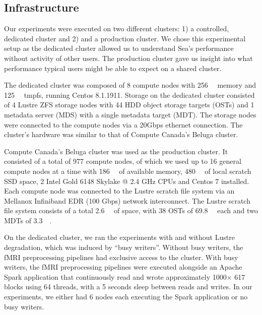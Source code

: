\documentclass[fleqn,10pt]{wlscirep}
\begin{document}
    
    \subsection{Infrastructure}
    
    Our experiments were executed on two different clusters: 1) a controlled, dedicated cluster
    and 2) and a production cluster. We chose this experimental setup as the dedicated
    cluster allowed us to understand Sea's performance without activity of other users.
    The production cluster gave us insight into what performance typical users might
    be able to expect on a shared cluster.

    The dedicated cluster was composed of 8
    compute nodes with \SI{256}{\gibi\byte} memory and \SI{125}{\gibi\byte}
    tmpfs, running Centos 8.1.1911.
    Storage on the dedicated cluster consisted of 4 Lustre ZFS storage nodes with 44
    HDD object storage targets (OSTs) and 1 metadata server (MDS) with a single
    metadata target (MDT). The storage nodes were connected to the compute nodes
    via a 20Gbps ethernet connection. The cluster's hardware was similar to that
    of Compute Canada's Beluga cluster.
    
    Compute Canada's Beluga cluster was used as the production cluster.
    It consisted of a total of 977 compute nodes, of which we
    used up to 16 general compute nodes at a time with \SI{186}{\gibi\byte} of
    available memory, \SI{480}{\gibi\byte} of local scratch SSD space, 2 Intel
    Gold 6148 Skylake @ 2.4 GHz CPUs and Centos 7 installed. Each compute node
    was connected to the Lustre scratch file system via an Mellanox Infiniband
    EDR (100 Gbps) network interconnect. The Lustre scratch file system consists
    of a total \SI{2.6}{\pebi\byte} of space, with 38 OSTs of
    \SI{69.8}{\tebi\byte} each and two MDTs of \SI{3.3}{\tebi\byte}.

    On the dedicated cluster, we ran the experiments with and without
    Lustre degradation, which was induced by ``busy writers''. Without busy
    writers, the fMRI preprocessing pipelines had exclusive access to the
    cluster. With busy writers, the fMRI preprocessing pipelines were executed
    alongside an Apache Spark application that continuously read and wrote approximately
    1000$\times$ \SI{617}{\mebi\byte} blocks using 64 threads, with a 5 seconds sleep between reads
    and writes. In our experiments, we either had 6 nodes each executing the
    Spark application or no busy writers.
\end{document}
